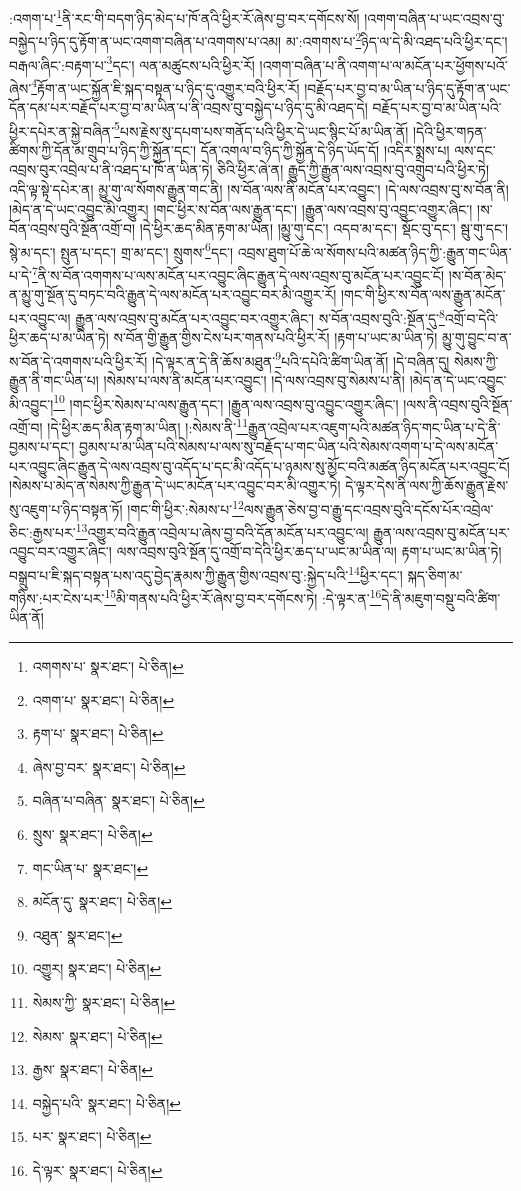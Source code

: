 :འགག་པ་\footnote{འགགས་པ་  སྣར་ཐང་།  པེ་ཅིན། }ནི་རང་གི་བདག་ཉིད་མེད་པ་ཁོ་ནའི་ཕྱིར་རོ་ཞེས་བྱ་བར་དགོངས་སོ། །འགག་བཞིན་པ་ཡང་འབྲས་བུ་བསྐྱེད་པ་ཉིད་དུ་རྟོག་ན་ཡང་འགག་བཞིན་པ་འགགས་པ་འམ། མ་:འགགས་པ་\footnote{འགག་པ་  སྣར་ཐང་།  པེ་ཅིན། }ཉིད་ལ་དེ་མི་འཐད་པའི་ཕྱིར་དང་། བརྒལ་ཞིང་:བརྟག་པ་\footnote{རྟག་པ་  སྣར་ཐང་།  པེ་ཅིན། }དང་། ལན་མཚུངས་པའི་ཕྱིར་རོ། །འགག་བཞིན་པ་ནི་འགག་པ་ལ་མངོན་པར་ཕྱོགས་པའོ་ཞེས་\footnote{ཞེས་བྱ་བར་  སྣར་ཐང་།  པེ་ཅིན། }རྟོག་ན་ཡང་སྐྱོན་ཇི་སྐད་བསྟན་པ་ཉིད་དུ་འགྱུར་བའི་ཕྱིར་རོ། །བརྗོད་པར་བྱ་བ་མ་ཡིན་པ་ཉིད་དུ་རྟོག་ན་ཡང་དོན་དམ་པར་བརྗོད་པར་བྱ་བ་མ་ཡིན་པ་ནི་འབྲས་བུ་བསྐྱེད་པ་ཉིད་དུ་མི་འཐད་དེ། བརྗོད་པར་བྱ་བ་མ་ཡིན་པའི་ཕྱིར་དཔེར་ན་སྐྱེ་བཞིན་\footnote{བཞིན་པ་བཞིན་  སྣར་ཐང་།  པེ་ཅིན། }པས་རྗེས་སུ་དཔག་པས་གནོད་པའི་ཕྱིར་དེ་ཡང་སྙིང་པོ་མ་ཡིན་ནོ། །དེའི་ཕྱིར་གཏན་ཚིགས་ཀྱི་དོན་མ་གྲུབ་པ་ཉིད་ཀྱི་སྐྱོན་དང་། དོན་འགལ་བ་ཉིད་ཀྱི་སྐྱོན་དེ་ཉིད་ཡོད་དོ། །འདིར་སྨྲས་པ། ལས་དང་འབྲས་བུར་འབྲེལ་པ་ནི་འཐད་པ་ཁོ་ན་ཡིན་ཏེ། ཅིའི་ཕྱིར་ཞེ་ན། རྒྱུད་ཀྱི་རྒྱུན་ལས་འབྲས་བུ་འགྲུབ་པའི་ཕྱིར་ཏེ། འདི་ལྟ་སྟེ་དཔེར་ན། མྱུ་གུ་ལ་སོགས་རྒྱུན་གང་ནི། །ས་བོན་ལས་ནི་མངོན་པར་འབྱུང་། །དེ་ལས་འབྲས་བུ་ས་བོན་ནི། །མེད་ན་དེ་ཡང་འབྱུང་མི་འགྱུར། །གང་ཕྱིར་ས་བོན་ལས་རྒྱུན་དང་། །རྒྱུན་ལས་འབྲས་བུ་འབྱུང་འགྱུར་ཞིང་། །ས་བོན་འབྲས་བུའི་སྔོན་འགྲོ་བ། །དེ་ཕྱིར་ཆད་མིན་རྟག་མ་ཡིན། །མྱུ་གུ་དང་། འདབ་མ་དང་། སྡོང་བུ་དང་། སྦུ་གུ་དང་། སྙེ་མ་དང་། སྤུན་པ་དང་། གྲ་མ་དང་། སྲུགས་\footnote{སྲུས་  སྣར་ཐང་།  པེ་ཅིན། }དང་། འབྲས་ཐུག་པོ་ཆེ་ལ་སོགས་པའི་མཚན་ཉིད་ཀྱི་:རྒྱུན་གང་ཡིན་པ་དེ་\footnote{གང་ཡིན་པ་  སྣར་ཐང་། }ནི་ས་བོན་འགགས་པ་ལས་མངོན་པར་འབྱུང་ཞིང་རྒྱུན་དེ་ལས་འབྲས་བུ་མངོན་པར་འབྱུང་ངོ། །ས་བོན་མེད་ན་མྱུ་གུ་སྔོན་དུ་བཏང་བའི་རྒྱུན་དེ་ལས་མངོན་པར་འབྱུང་བར་མི་འགྱུར་རོ། །གང་གི་ཕྱིར་ས་བོན་ལས་རྒྱུན་མངོན་པར་འབྱུང་ལ། རྒྱུན་ལས་འབྲས་བུ་མངོན་པར་འབྱུང་བར་འགྱུར་ཞིང་། ས་བོན་འབྲས་བུའི་:སྔོན་དུ་\footnote{མངོན་དུ་  སྣར་ཐང་།  པེ་ཅིན། }འགྲོ་བ་དེའི་ཕྱིར་ཆད་པ་མ་ཡིན་ཏེ། ས་བོན་གྱི་རྒྱུན་གྱིས་ངེས་པར་གནས་པའི་ཕྱིར་རོ། །རྟག་པ་ཡང་མ་ཡིན་ཏེ། མྱུ་གུ་བྱུང་བ་ན་ས་བོན་དེ་འགགས་པའི་ཕྱིར་རོ། །དེ་ལྟར་ན་དེ་ནི་ཆོས་མཐུན་\footnote{འཐུན་  སྣར་ཐང་། }པའི་དཔེའི་ཚིག་ཡིན་ནོ། །དེ་བཞིན་དུ། སེམས་ཀྱི་རྒྱུན་ནི་གང་ཡིན་པ། །སེམས་པ་ལས་ནི་མངོན་པར་འབྱུང་། །དེ་ལས་འབྲས་བུ་སེམས་པ་ནི། །མེད་ན་དེ་ཡང་འབྱུང་མི་འབྱུང་།\footnote{འགྱུར།  སྣར་ཐང་།  པེ་ཅིན། } །གང་ཕྱིར་སེམས་པ་ལས་རྒྱུན་དང་། །རྒྱུན་ལས་འབྲས་བུ་འབྱུང་འགྱུར་ཞིང་། །ལས་ནི་འབྲས་བུའི་སྔོན་འགྲོ་བ། །དེ་ཕྱིར་ཆད་མིན་རྟག་མ་ཡིན། །:སེམས་ནི་\footnote{སེམས་ཀྱི་  སྣར་ཐང་།  པེ་ཅིན། }རྒྱུན་འབྲེལ་པར་འཇུག་པའི་མཚན་ཉིད་གང་ཡིན་པ་དེ་ནི་བྱམས་པ་དང་། བྱམས་པ་མ་ཡིན་པའི་སེམས་པ་ལས་སུ་བརྗོད་པ་གང་ཡིན་པའི་སེམས་འགག་པ་དེ་ལས་མངོན་པར་འབྱུང་ཞིང་རྒྱུན་དེ་ལས་འབྲས་བུ་འདོད་པ་དང་མི་འདོད་པ་ཉམས་སུ་མྱོང་བའི་མཚན་ཉིད་མངོན་པར་འབྱུང་ངོ། །སེམས་པ་མེད་ན་སེམས་ཀྱི་རྒྱུན་དེ་ཡང་མངོན་པར་འབྱུང་བར་མི་འགྱུར་ཏེ། དེ་ལྟར་དེས་ནི་ལས་ཀྱི་ཆོས་རྒྱུན་རྗེས་སུ་འཇུག་པ་ཉིད་བསྟན་ཏོ། །གང་གི་ཕྱིར་:སེམས་པ་\footnote{སེམས་  སྣར་ཐང་།  པེ་ཅིན། }ལས་རྒྱུན་ཅེས་བྱ་བ་རྒྱུ་དང་འབྲས་བུའི་དངོས་པོར་འབྲེལ་ཅིང་:རྒྱས་པར་\footnote{རྒྱས་  སྣར་ཐང་།  པེ་ཅིན། }འགྱུར་བའི་རྒྱུན་འབྲེལ་པ་ཞེས་བྱ་བའི་དོན་མངོན་པར་འབྱུང་ལ། རྒྱུན་ལས་འབྲས་བུ་མངོན་པར་འབྱུང་བར་འགྱུར་ཞིང་། ལས་འབྲས་བུའི་སྔོན་དུ་འགྲོ་བ་དེའི་ཕྱིར་ཆད་པ་ཡང་མ་ཡིན་ལ། རྟག་པ་ཡང་མ་ཡིན་ཏེ། བསྒྲུབ་པ་ཇི་སྐད་བསྟན་པས་འདུ་བྱེད་རྣམས་ཀྱི་རྒྱུན་གྱིས་འབྲས་བུ་:སྐྱེད་པའི་\footnote{བསྐྱེད་པའི་  སྣར་ཐང་།  པེ་ཅིན། }ཕྱིར་དང་། སྐད་ཅིག་མ་གཉིས་:པར་ངེས་པར་\footnote{པར་  སྣར་ཐང་།  པེ་ཅིན། }མི་གནས་པའི་ཕྱིར་རོ་ཞེས་བྱ་བར་དགོངས་ཏེ། :དེ་ལྟར་ན་\footnote{དེ་ལྟར་  སྣར་ཐང་།  པེ་ཅིན། }དེ་ནི་མཇུག་བསྡུ་བའི་ཚིག་ཡིན་ནོ། 